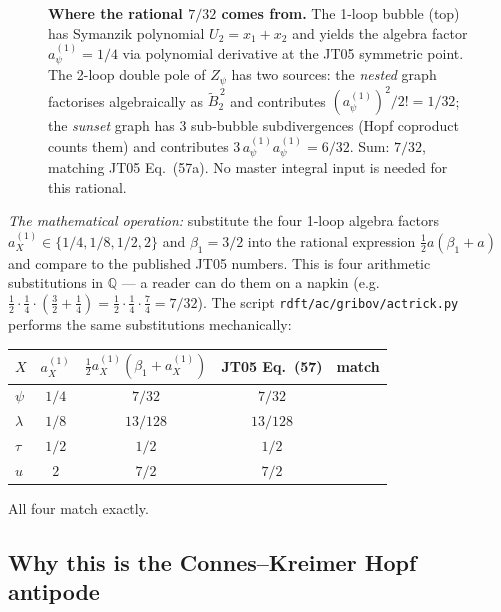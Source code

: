\documentclass[11pt,a4paper]{article}
\theoremstyle{definition}
\theoremstyle{plain}
\begin{document}
\begin{figure}[htbp]
\caption{\textbf{Where the rational $7/32$ comes from.}  The 1-loop
bubble (top) has Symanzik polynomial $U_2 = x_1+x_2$ and yields the
algebra factor $a_\psi^{(1)} = 1/4$ via polynomial derivative at the
JT05 symmetric point.  The 2-loop double pole of $Z_\psi$ has two
sources: the \emph{nested} graph factorises algebraically as $\tilde
B_2^{\,2}$ and contributes $(a_\psi^{(1)})^2/2! = 1/32$; the
\emph{sunset} graph has 3 sub-bubble subdivergences (Hopf coproduct
counts them) and contributes $3\,a_\psi^{(1)} a_\psi^{(1)} = 6/32$.
Sum: $7/32$, matching JT05 Eq.~(57a).  No master integral input is
needed for this rational.}
\label{fig:7over32}
\end{figure}

\begin{codebox}
\emph{The mathematical operation:} substitute the four 1-loop algebra
factors $a_X^{(1)} \in \{1/4, 1/8, 1/2, 2\}$ and $\beta_1 = 3/2$ into
the rational expression $\tfrac{1}{2} a (\beta_1 + a)$ and compare to
the published JT05 numbers.  This is four arithmetic substitutions in
$\mathbb{Q}$ --- a reader can do them on a napkin (e.g.\
$\tfrac{1}{2}\cdot\tfrac{1}{4}\cdot(\tfrac{3}{2} + \tfrac{1}{4}) =
\tfrac{1}{2}\cdot\tfrac{1}{4}\cdot\tfrac{7}{4} = 7/32$).  The script
\texttt{rdft/ac/gribov/actrick.py} performs the same substitutions
mechanically:
\begin{center}
\begin{tabular}{@{}lcccc@{}}
\toprule
$X$ & $a_X^{(1)}$ & $\tfrac{1}{2}a_X^{(1)}(\beta_1{+}a_X^{(1)})$
    & JT05 Eq.~(57) & match \\
\midrule
$\psi$    & $1/4$ & $7/32$    & $7/32$    & \checkmark\\
$\lambda$ & $1/8$ & $13/128$  & $13/128$  & \checkmark\\
$\tau$    & $1/2$ & $1/2$     & $1/2$     & \checkmark\\
$u$       & $2$   & $7/2$     & $7/2$     & \checkmark\\
\bottomrule
\end{tabular}
\end{center}
All four match exactly.
\end{codebox}

\subsection{Why this is the Connes--Kreimer Hopf antipode}
\end{document}
